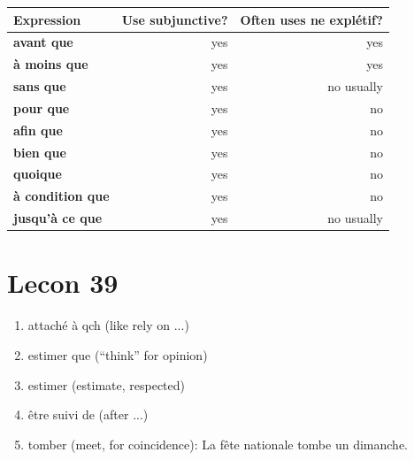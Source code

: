 \documentclass{book}
\begin{document}
        \begin{tabular}{|l|r|r|}
            \hline
            \textbf{Expression} & \textbf{Use subjunctive?} & \textbf{Often uses ne explétif?} \\
            \hline
            \textbf{avant que} & yes & yes \\
            \textbf{à moins que} & yes & yes \\
            \textbf{sans que} & yes & no usually \\
            \textbf{pour que} & yes & no \\
            \textbf{afin que} & yes & no \\
            \textbf{bien que} & yes & no \\
            \textbf{quoique} & yes & no \\
            \textbf{à condition que} & yes & no \\
            \textbf{jusqu'à ce que} & yes & no usually \\
            \hline
        \end{tabular}

\chapter{Lecon 39}
    \begin{enumerate}
        \item attaché à qch (like rely on ...)
        \item estimer que (``think'' for opinion)
        \item estimer (estimate, respected)
        \item être suivi de (after ...)
        \item tomber (meet, for coincidence): La fête nationale tombe un dimanche.
    \end{enumerate}
\end{document}
